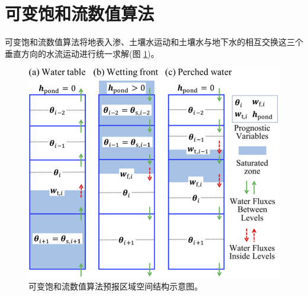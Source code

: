 \section{可变饱和流数值算法}
可变饱和流数值算法将地表入渗、土壤水运动和土壤水与地下水的相互交换这三个垂直方向的水流运动进行统一求解(图 \ref{fig:可变饱和流数值算法预报区域空间结构示意图})。
{
\begin{figure}[]
\centering
\includegraphics{Figures/陆地表面的水分循环/可变饱和流数值算法预报区域空间结构示意图.png}
\caption{可变饱和流数值算法预报区域空间结构示意图。}
\label{fig:可变饱和流数值算法预报区域空间结构示意图}
\end{figure}
}

